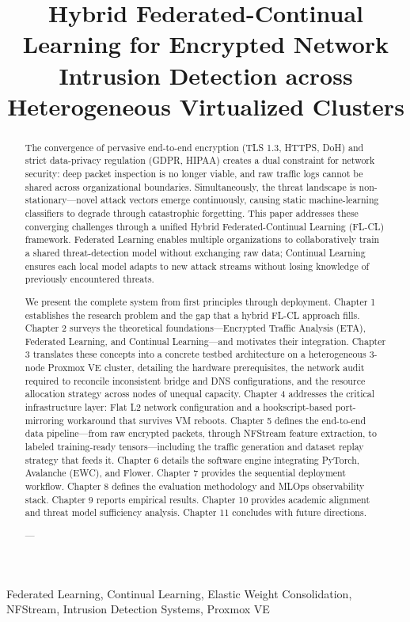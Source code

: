 \documentclass[conference]{IEEEtran}
\begin{document}
\title{Hybrid Federated-Continual Learning for Encrypted Network Intrusion Detection across Heterogeneous Virtualized Clusters}
\author{ }
\maketitle
\begin{abstract}
The convergence of pervasive end-to-end encryption (TLS 1.3, HTTPS, DoH) and strict data-privacy regulation (GDPR, HIPAA) creates a dual constraint for network security: deep packet inspection is no longer viable, and raw traffic logs cannot be shared across organizational boundaries. Simultaneously, the threat landscape is non-stationary—novel attack vectors emerge continuously, causing static machine-learning classifiers to degrade through catastrophic forgetting. This paper addresses these converging challenges through a unified Hybrid Federated-Continual Learning (FL-CL) framework. Federated Learning enables multiple organizations to collaboratively train a shared threat-detection model without exchanging raw data; Continual Learning ensures each local model adapts to new attack streams without losing knowledge of previously encountered threats.

We present the complete system from first principles through deployment. Chapter 1 establishes the research problem and the gap that a hybrid FL-CL approach fills. Chapter 2 surveys the theoretical foundations—Encrypted Traffic Analysis (ETA), Federated Learning, and Continual Learning—and motivates their integration. Chapter 3 translates these concepts into a concrete testbed architecture on a heterogeneous 3-node Proxmox VE cluster, detailing the hardware prerequisites, the network audit required to reconcile inconsistent bridge and DNS configurations, and the resource allocation strategy across nodes of unequal capacity. Chapter 4 addresses the critical infrastructure layer: Flat L2 network configuration and a hookscript-based port-mirroring workaround that survives VM reboots. Chapter 5 defines the end-to-end data pipeline—from raw encrypted packets, through NFStream feature extraction, to labeled training-ready tensors—including the traffic generation and dataset replay strategy that feeds it. Chapter 6 details the software engine integrating PyTorch, Avalanche (EWC), and Flower. Chapter 7 provides the sequential deployment workflow. Chapter 8 defines the evaluation methodology and MLOps observability stack. Chapter 9 reports empirical results. Chapter 10 provides academic alignment and threat model sufficiency analysis. Chapter 11 concludes with future directions.

---
\end{abstract}
\begin{IEEEkeywords}
Federated Learning, Continual Learning, Elastic Weight Consolidation, NFStream, Intrusion Detection Systems, Proxmox VE
\end{IEEEkeywords}
\end{document}
